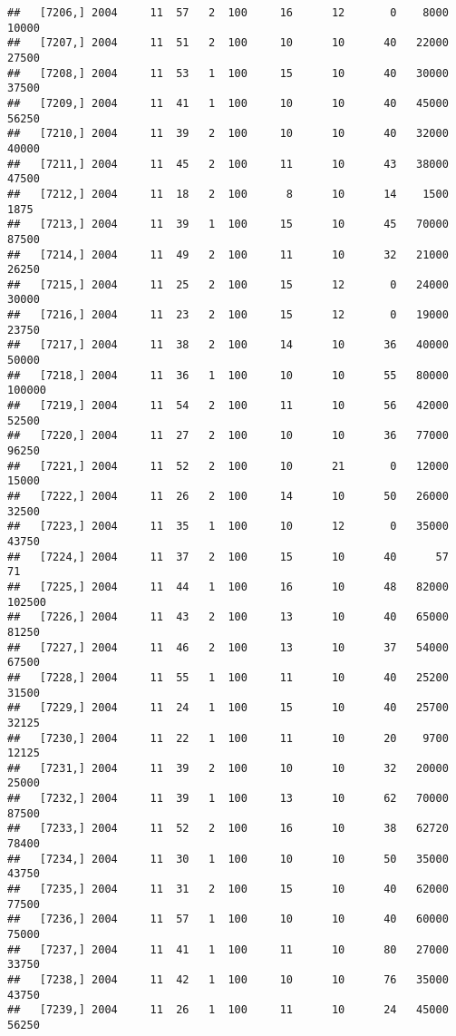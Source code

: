 \documentclass{article}\usepackage[]{graphicx}\usepackage[]{color}
\makeatletter
\newenvironment{kframe}{%
 \def\at@end@of@kframe{}%
 \ifinner\ifhmode%
  \def\at@end@of@kframe{\end{minipage}}%
  \begin{minipage}{\columnwidth}%
 \fi\fi%
 \def\FrameCommand##1{\hskip\@totalleftmargin \hskip-\fboxsep
 \colorbox{shadecolor}{##1}\hskip-\fboxsep
     \hskip-\linewidth \hskip-\@totalleftmargin \hskip\columnwidth}%
 \MakeFramed {\advance\hsize-\width
   \@totalleftmargin\z@ \linewidth\hsize
   \@setminipage}}%
 {\par\unskip\endMakeFramed%
 \at@end@of@kframe}
\newenvironment{knitrout}{}{} %
\makeatother
\begin{document}
\begin{knitrout}
\begin{kframe}
\begin{verbatim}
##   [7206,] 2004     11  57   2  100     16      12       0    8000   10000
##   [7207,] 2004     11  51   2  100     10      10      40   22000   27500
##   [7208,] 2004     11  53   1  100     15      10      40   30000   37500
##   [7209,] 2004     11  41   1  100     10      10      40   45000   56250
##   [7210,] 2004     11  39   2  100     10      10      40   32000   40000
##   [7211,] 2004     11  45   2  100     11      10      43   38000   47500
##   [7212,] 2004     11  18   2  100      8      10      14    1500    1875
##   [7213,] 2004     11  39   1  100     15      10      45   70000   87500
##   [7214,] 2004     11  49   2  100     11      10      32   21000   26250
##   [7215,] 2004     11  25   2  100     15      12       0   24000   30000
##   [7216,] 2004     11  23   2  100     15      12       0   19000   23750
##   [7217,] 2004     11  38   2  100     14      10      36   40000   50000
##   [7218,] 2004     11  36   1  100     10      10      55   80000  100000
##   [7219,] 2004     11  54   2  100     11      10      56   42000   52500
##   [7220,] 2004     11  27   2  100     10      10      36   77000   96250
##   [7221,] 2004     11  52   2  100     10      21       0   12000   15000
##   [7222,] 2004     11  26   2  100     14      10      50   26000   32500
##   [7223,] 2004     11  35   1  100     10      12       0   35000   43750
##   [7224,] 2004     11  37   2  100     15      10      40      57      71
##   [7225,] 2004     11  44   1  100     16      10      48   82000  102500
##   [7226,] 2004     11  43   2  100     13      10      40   65000   81250
##   [7227,] 2004     11  46   2  100     13      10      37   54000   67500
##   [7228,] 2004     11  55   1  100     11      10      40   25200   31500
##   [7229,] 2004     11  24   1  100     15      10      40   25700   32125
##   [7230,] 2004     11  22   1  100     11      10      20    9700   12125
##   [7231,] 2004     11  39   2  100     10      10      32   20000   25000
##   [7232,] 2004     11  39   1  100     13      10      62   70000   87500
##   [7233,] 2004     11  52   2  100     16      10      38   62720   78400
##   [7234,] 2004     11  30   1  100     10      10      50   35000   43750
##   [7235,] 2004     11  31   2  100     15      10      40   62000   77500
##   [7236,] 2004     11  57   1  100     10      10      40   60000   75000
##   [7237,] 2004     11  41   1  100     11      10      80   27000   33750
##   [7238,] 2004     11  42   1  100     10      10      76   35000   43750
##   [7239,] 2004     11  26   1  100     11      10      24   45000   56250

\end{verbatim}
\end{kframe}
\end{knitrout}
\end{document}
